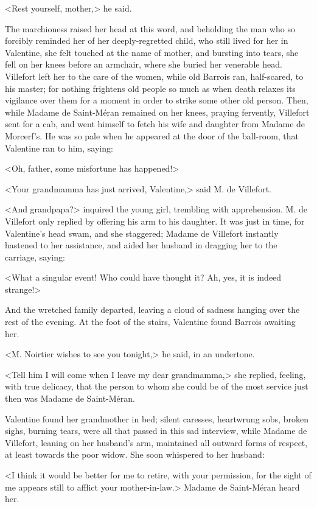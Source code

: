  <Rest yourself, mother,> he said. 

 The marchioness raised her head at this word, and beholding the man who so forcibly reminded her of her deeply-regretted child, who still lived for her in Valentine, she felt touched at the name of mother, and bursting into tears, she fell on her knees before an armchair, where she buried her venerable head. Villefort left her to the care of the women, while old Barrois ran, half-scared, to his master; for nothing frightens old people so much as when death relaxes its vigilance over them for a moment in order to strike some other old person. Then, while Madame de Saint-Méran remained on her knees, praying fervently, Villefort sent for a cab, and went himself to fetch his wife and daughter from Madame de Morcerf's. He was so pale when he appeared at the door of the ball-room, that Valentine ran to him, saying: 

 <Oh, father, some misfortune has happened!> 

 <Your grandmamma has just arrived, Valentine,> said M. de Villefort. 

 <And grandpapa?> inquired the young girl, trembling with apprehension. M. de Villefort only replied by offering his arm to his daughter. It was just in time, for Valentine's head swam, and she staggered; Madame de Villefort instantly hastened to her assistance, and aided her husband in dragging her to the carriage, saying: 

 <What a singular event! Who could have thought it? Ah, yes, it is indeed strange!> 

 And the wretched family departed, leaving a cloud of sadness hanging over the rest of the evening. At the foot of the stairs, Valentine found Barrois awaiting her. 

 <M. Noirtier wishes to see you tonight,> he said, in an undertone. 

 <Tell him I will come when I leave my dear grandmamma,> she replied, feeling, with true delicacy, that the person to whom she could be of the most service just then was Madame de Saint-Méran. 

 Valentine found her grandmother in bed; silent caresses, heartwrung sobs, broken sighs, burning tears, were all that passed in this sad interview, while Madame de Villefort, leaning on her husband's arm, maintained all outward forms of respect, at least towards the poor widow. She soon whispered to her husband: 

 <I think it would be better for me to retire, with your permission, for the sight of me appears still to afflict your mother-in-law.> Madame de Saint-Méran heard her. 


